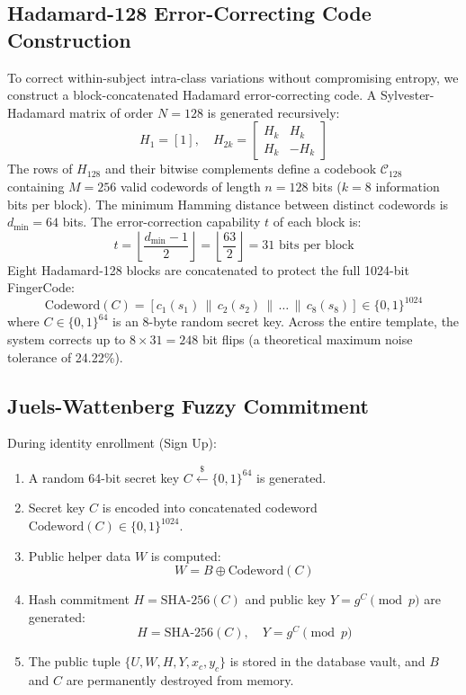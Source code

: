 \documentclass[conference]{IEEEtran}
\begin{document}
\subsection{Hadamard-128 Error-Correcting Code Construction}
To correct within-subject intra-class variations without compromising entropy, we construct a block-concatenated Hadamard error-correcting code. A Sylvester-Hadamard matrix of order $N = 128$ is generated recursively:
\begin{equation}
H_1 = [1], \quad H_{2k} = \begin{bmatrix} H_k & H_k \\ H_k & -H_k \end{bmatrix}
\label{eq:hadamard}
\end{equation}
The rows of $H_{128}$ and their bitwise complements define a codebook $\mathcal{C}_{128}$ containing $M = 256$ valid codewords of length $n = 128$ bits ($k = 8$ information bits per block). The minimum Hamming distance between distinct codewords is $d_{\min} = 64$ bits. The error-correction capability $t$ of each block is:
\begin{equation}
t = \left\lfloor \frac{d_{\min} - 1}{2} \right\rfloor = \left\lfloor \frac{63}{2} \right\rfloor = 31 \text{ bits per block}
\label{eq:error_bound}
\end{equation}
Eight Hadamard-128 blocks are concatenated to protect the full 1024-bit FingerCode:
\begin{equation}
\text{Codeword}(C) = [c_1(s_1) \,\|\, c_2(s_2) \,\|\, \dots \,\|\, c_8(s_8)] \in \{0, 1\}^{1024}
\label{eq:codeword}
\end{equation}
where $C \in \{0, 1\}^{64}$ is an 8-byte random secret key. Across the entire template, the system corrects up to $8 \times 31 = 248$ bit flips (a theoretical maximum noise tolerance of 24.22\%).

\subsection{Juels-Wattenberg Fuzzy Commitment}
During identity enrollment (Sign Up):
\begin{enumerate}[itemsep=2pt, topsep=2pt]
    \item A random 64-bit secret key $C \xleftarrow{\$} \{0, 1\}^{64}$ is generated.
    \item Secret key $C$ is encoded into concatenated codeword $\text{Codeword}(C) \in \{0, 1\}^{1024}$.
    \item Public helper data $W$ is computed:
    \begin{equation}
    W = B \oplus \text{Codeword}(C)
    \label{eq:helper}
    \end{equation}
    \item Hash commitment $H = \text{SHA-256}(C)$ and public key $Y = g^C \pmod p$ are generated:
    \begin{equation}
    H = \text{SHA-256}(C), \quad Y = g^C \pmod p
    \label{eq:commitment}
    \end{equation}
    \item The public tuple $\{U, W, H, Y, x_c, y_c\}$ is stored in the database vault, and $B$ and $C$ are permanently destroyed from memory.
\end{enumerate}
\end{document}
